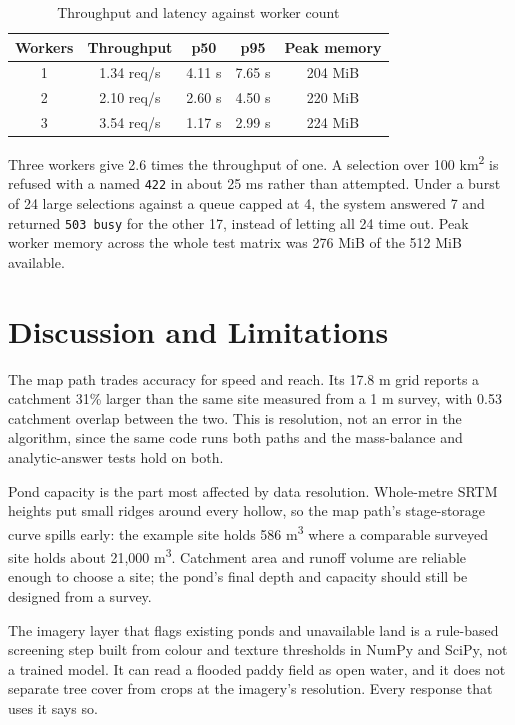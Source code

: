 \documentclass[manuscript,screen,review]{acmart}
\begin{document}
\begin{table}[h]
  \caption{Throughput and latency against worker count}
  \label{tab:scaling}
  \begin{tabular}{ccccc}
    \toprule
    Workers & Throughput & p50 & p95 & Peak memory \\
    \midrule
    1 & 1.34 req/s & 4.11 s & 7.65 s & 204 MiB \\
    2 & 2.10 req/s & 2.60 s & 4.50 s & 220 MiB \\
    3 & 3.54 req/s & 1.17 s & 2.99 s & 224 MiB \\
    \bottomrule
  \end{tabular}
\end{table}

Three workers give 2.6 times the throughput of one. A selection over
100 km\textsuperscript{2} is refused with a named \texttt{422} in about 25 ms rather
than attempted. Under a burst of 24 large selections against a queue capped at 4, the
system answered 7 and returned \texttt{503 busy} for the other 17, instead of letting
all 24 time out. Peak worker memory across the whole test matrix was 276 MiB of the
512 MiB available.

\section{Discussion and Limitations}
\label{sec:discussion}

The map path trades accuracy for speed and reach. Its 17.8 m grid reports a catchment
31\% larger than the same site measured from a 1 m survey, with 0.53 catchment overlap
between the two. This is resolution, not an error in the algorithm, since the same code
runs both paths and the mass-balance and analytic-answer tests hold on both.

Pond capacity is the part most affected by data resolution. Whole-metre SRTM heights
put small ridges around every hollow, so the map path's stage-storage curve spills
early: the example site holds 586 m\textsuperscript{3} where a comparable surveyed site
holds about 21,000 m\textsuperscript{3}. Catchment area and runoff volume are reliable
enough to choose a site; the pond's final depth and capacity should still be designed
from a survey.

The imagery layer that flags existing ponds and unavailable land is a rule-based
screening step built from colour and texture thresholds in NumPy and SciPy, not a
trained model. It can read a flooded paddy field as open water, and it does not
separate tree cover from crops at the imagery's resolution. Every response that uses it
says so.
\end{document}
